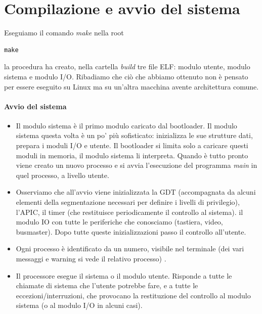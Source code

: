 \documentclass[11pt]{report}
\theoremstyle{definition}
\begin{document}
\section{Compilazione e avvio del sistema}
Eseguiamo il comando \emph{make} nella root
\begin{verbatim}
make
\end{verbatim}
la procedura ha creato, nella cartella \emph{build} tre file ELF: modulo utente, modulo sistema e modulo I/O. Ribadiamo che ciò che abbiamo ottenuto non è pensato per essere eseguito su Linux ma su un'altra macchina avente architettura comune.
 

\paragraph{Avvio del sistema}
\begin{itemize}
\item Il modulo sistema è il primo modulo caricato dal bootloader. Il modulo sistema questa volta è un po' più sofisticato: inizializza le sue strutture dati, prepara i moduli I/O e utente. Il bootloader si limita solo a caricare questi moduli in memoria, il modulo sistema li interpreta. Quando è tutto pronto viene creato un nuovo processo e si avvia l'esecuzione del programma \emph{main} in quel processo, a livello utente. 
\item Osserviamo che all'avvio viene inizializzata la GDT (accompagnata da alcuni elementi della segmentazione necessari per definire i livelli di privilegio), l'APIC, il timer (che restituisce periodicamente il controllo al sistema). il modulo IO con tutte le periferiche che conosciamo (tastiera, video, busmaster). Dopo tutte queste inizializzazioni passo il controllo all'utente.
\item Ogni processo è identificato da un numero, visibile nel terminale (dei vari messaggi e warning si vede il relativo processo) .
\item Il processore esegue il sistema o il modulo utente. Risponde a tutte le chiamate di sistema che l'utente potrebbe fare, e a tutte le eccezioni/interruzioni, che provocano la restituzione del controllo al modulo sistema (o al modulo I/O in alcuni casi).
\end{itemize}
\end{document}
